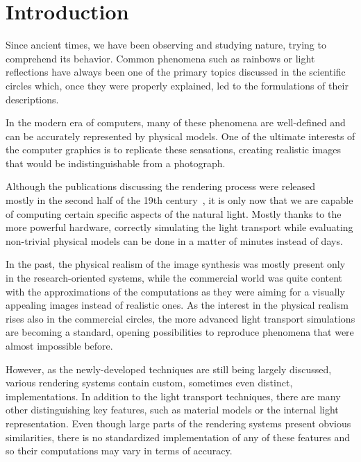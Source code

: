 \chapter*{Introduction}

Since ancient times, we have been observing and studying nature, trying to comprehend its behavior. Common phenomena such as rainbows or light reflections have always been one of the primary topics discussed in the scientific circles which, once they were properly explained, led to the formulations of their descriptions.

In the modern era of computers, many of these phenomena are well-defined and can be accurately represented by physical models. One of the ultimate interests of the computer graphics is to replicate these sensations, creating realistic images that would be indistinguishable from a photograph.

Although the publications discussing the rendering process were released \\ mostly in the second half of the 19th century~\cite{kajiya1986rendering}\cite{nicodemus1965directional}, it is only now that we are capable of computing certain specific aspects of the natural light. Mostly thanks to the more powerful hardware, correctly simulating the light transport while evaluating non-trivial physical models can be done in a matter of minutes instead of days.

In the past, the physical realism of the image synthesis was mostly present only in the research-oriented systems, while the commercial world was quite content with the approximations of the computations as they were aiming for a visually appealing images instead of realistic ones. As the interest in the physical realism rises also in the commercial circles, the more advanced light transport simulations are becoming a standard, opening possibilities to reproduce phenomena that were almost impossible before.

However, as the newly-developed techniques are still being largely discussed, various rendering systems contain custom, sometimes even distinct, implementations. In addition to the light transport techniques, there are many other distinguishing key features, such as material models or the internal light representation. Even though large parts of the rendering systems present obvious similarities, there is no standardized implementation of any of these features and so their computations may vary in terms of accuracy.


